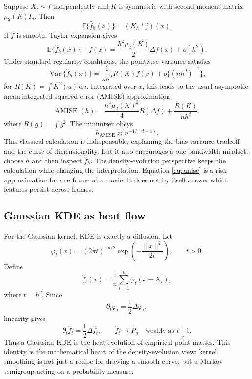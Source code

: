 \documentclass[preprint]{imsart}
\theoremstyle{plain}
\theoremstyle{definition}
\newcommand{\E}{\mathbb{E}}
\newcommand{\Var}{\operatorname{Var}}
\newcommand{\dd}{\,\mathrm{d}}
\newcommand{\Emp}{\widehat P_n}
\newcommand{\fhat}{\widehat f}
\newcommand{\AMISE}{\operatorname{AMISE}}
\begin{document}
Suppose $X_i\sim f$ independently and $K$ is symmetric with second moment matrix $\mu_2(K)I_d$. Then
\[
  \E\{\fhat_h(x)\}=(K_h*f)(x).
\]
If $f$ is smooth, Taylor expansion gives
\begin{equation*}
  \E\{\fhat_h(x)\}-f(x)
  = \frac{h^2\mu_2(K)}{2}\Delta f(x)+o(h^2).
\end{equation*}
Under standard regularity conditions, the pointwise variance satisfies
\begin{equation*}
  \Var\{\fhat_h(x)\}
  = \frac{1}{nh^d}R(K)f(x)+o\{(nh^d)^{-1}\},
\end{equation*}
for $R(K)=\int K^2(u)\dd u$.
Integrated over $x$, this leads to the usual asymptotic mean integrated squared error (AMISE) approximation
\begin{equation}
  \AMISE(h)
  = \frac{h^4\mu_2(K)^2}{4}R(\Delta f)+\frac{R(K)}{nh^d},
  \label{eq:amise}
\end{equation}
where $R(g)=\int g^2$. The minimizer obeys
\begin{equation}
  h_{\AMISE}\asymp n^{-1/(d+4)}.
  \label{eq:amise-rate}
\end{equation}
This classical calculation is indispensable, explaining the bias-variance tradeoff and the curse of dimensionality. But it also encourages a one-bandwidth mindset: choose $h$ and then inspect $\fhat_h$. The density-evolution perspective keeps the calculation while changing the interpretation. Equation \eqref{eq:amise} is a risk approximation for one frame of a movie. It does not by itself answer which features persist across frames.

\subsection{Gaussian KDE as heat flow}
\label{subsec:kde-heat}

For the Gaussian kernel, KDE is exactly a diffusion. Let
\begin{equation*}
  \varphi_t(x)=(2\pi t)^{-d/2}\exp\left(-\frac{\|x\|^2}{2t}\right),
  \qquad t>0.
\end{equation*}
Define
\begin{equation*}
  \fhat_t(x)=\frac{1}{n}\sum_{i=1}^n \varphi_t(x-X_i),
\end{equation*}
where $t=h^2$. Since
\[
  \partial_t\varphi_t=\frac12\Delta\varphi_t,
\]
linearity gives
\begin{equation*}  \partial_t\fhat_t=\frac12\Delta\fhat_t,
  \qquad
  \fhat_t\to\Emp\quad\text{weakly as }t\downarrow0.
\end{equation*}
Thus a Gaussian KDE is the heat evolution of empirical point masses. 
This identity is the mathematical heart of the density-evolution view:
kernel smoothing is not just a recipe for drawing a smooth curve, but a
Markov semigroup acting on a probability measure.
\end{document}
